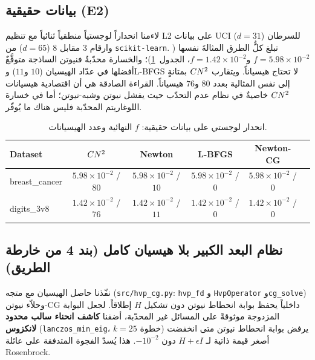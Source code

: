 \subsection{بيانات حقيقية (E2)}
لاءمنا انحداراً لوجستياً منطقياً ثنائياً مع تنظيم L2 على بيانات UCI للسرطان ($d{=}31$)
وارقام 3 مقابل 8 ($d{=}65$) من \textenglish{\texttt{scikit-learn}}. تبلغ كلُّ الطرق المثالةَ
نفسها ($f=5.98{\times}10^{-2}$ و$f=1.42{\times}10^{-2}$، الجدول~\ref{tab:e2-ar})؛ والخسارة
محدّبةٌ فنيوتن الساذجة متوقَّعٌ أفضلها في عدّاد الهيسيان ($10$ و$11$) وL-BFGS لا تحتاج هيسياناً.
ويتقارب $CN^2$ بمتانةٍ إلى نفس المثالية بعدد $80$ و$76$ هيسياناً. القراءة الصادقة هي أن اقتصادية
هيسيانات $CN^2$ خاصيةٌ في نظام عدم التحدّب حيث يفشل نيوتن وشبه-نيوتن؛ أما في خسارة
اللوغاريتم المحدّبة فليس هناك ما يُوفّر.

\begin{table}[H]
\centering
\caption{انحدار لوجستي على بيانات حقيقية: $f$ النهائية وعدد الهيسيانات.}
\label{tab:e2-ar}
\begin{english}\small
\begin{tabular}{lccccc}
\toprule
Dataset & $CN^2$ & Newton & L-BFGS & Newton-CG\\
\midrule
breast\_cancer &
  $5.98{\times}10^{-2}$ / $80$ &
  $5.98{\times}10^{-2}$ / $10$ &
  $5.98{\times}10^{-2}$ / $0$ &
  $5.98{\times}10^{-2}$ / $0$\\
digits\_3v8 &
  $1.42{\times}10^{-2}$ / $76$ &
  $1.42{\times}10^{-2}$ / $11$ &
  $1.42{\times}10^{-2}$ / $0$ &
  $1.42{\times}10^{-2}$ / $0$\\
\bottomrule
\end{tabular}
\end{english}
\end{table}

\subsection{نظام البعد الكبير بلا هيسيان كامل (بند 4 من خارطة الطريق)}
نفّذنا حاصل الهيسيان مع متجه (\textenglish{\texttt{src/hvp\_cg.py}}: \textenglish{\texttt{hvp\_fd}} و
\textenglish{\texttt{HvpOperator}} و\textenglish{\texttt{cg\_solve}}) وحلاّء نيوتن-CG داخلياً يحفظ بوابة انحطاط
نيوتن دون تشكيل $H$ إطلاقاً. لجعل البوابة المزدوجة موثوقةً على المسائل غير المحدّبة، أضفنا
\textbf{كاشف انحناء سالب محدود لانكزوس} (\textenglish{\texttt{lanczos\_min\_eig}}، $k=25$ خطوة)
يرفض بوابة انحطاط نيوتن متى انخفضت أصغر قيمة ذاتية لـ $H+\epsilon I$ دون $-10^{-2}$. هذا
يُسدّ الفجوة المتدفقة على عائلة Rosenbrock.

